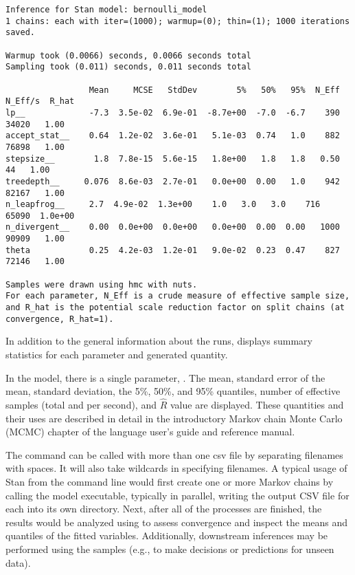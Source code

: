 \begin{Verbatim}[fontshape=sl,fontsize=\footnotesize]
Inference for Stan model: bernoulli_model
1 chains: each with iter=(1000); warmup=(0); thin=(1); 1000 iterations saved.

Warmup took (0.0066) seconds, 0.0066 seconds total
Sampling took (0.011) seconds, 0.011 seconds total

                 Mean     MCSE   StdDev        5%   50%   95%  N_Eff  N_Eff/s  R_hat
lp__             -7.3  3.5e-02  6.9e-01  -8.7e+00  -7.0  -6.7    390    34020   1.00
accept_stat__    0.64  1.2e-02  3.6e-01   5.1e-03  0.74   1.0    882    76898   1.00
stepsize__        1.8  7.8e-15  5.6e-15   1.8e+00   1.8   1.8   0.50       44   1.00
treedepth__     0.076  8.6e-03  2.7e-01   0.0e+00  0.00   1.0    942    82167   1.00
n_leapfrog__     2.7  4.9e-02  1.3e+00    1.0   3.0   3.0    716    65090  1.0e+00
n_divergent__    0.00  0.0e+00  0.0e+00   0.0e+00  0.00  0.00   1000    90909   1.00
theta            0.25  4.2e-03  1.2e-01   9.0e-02  0.23  0.47    827    72146   1.00

Samples were drawn using hmc with nuts.
For each parameter, N_Eff is a crude measure of effective sample size,
and R_hat is the potential scale reduction factor on split chains (at 
convergence, R_hat=1).
\end{Verbatim}
%
In addition to the general information about the runs, 
displays summary statistics for each parameter and generated
quantity.

In the  model, there is a single parameter,
. The mean, standard error of the mean, standard
deviation, the 5\%, 50\%, and 95\% quantiles, number of effective
samples (total and per second), and $\hat{R}$ value are displayed.
These quantities and their uses are described in detail in the
introductory Markov chain Monte Carlo (MCMC) chapter of the language
user's guide and reference manual.

The command  can be called with more than one csv file
by separating filenames with spaces. It will also take wildcards in
specifying filenames. A typical usage of Stan from the command line
would first create one or more Markov chains by calling the model
executable, typically in parallel, writing the output CSV file for
each into its own directory.  Next, after all of the processes are
finished, the results would be analyzed using  to assess
convergence and inspect the means and quantiles of the fitted
variables.  Additionally, downstream inferences may be performed using
the samples (e.g., to make decisions or predictions for unseen data).

